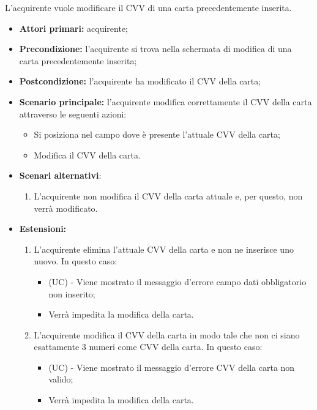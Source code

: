L'acquirente vuole modificare il CVV di una carta precedentemente inserita.
\begin{itemize}
    \item \textbf{Attori primari:} acquirente;
    \item \textbf{Precondizione:} l'acquirente si trova nella schermata di modifica di una carta precedentemente inserita;
    \item \textbf{Postcondizione:} l'acquirente ha modificato il CVV della carta;
    \item \textbf{Scenario principale:} l'acquirente modifica correttamente il CVV della carta attraverso le seguenti azioni:
    \begin{itemize}
        \item Si posiziona nel campo dove è presente l'attuale CVV della carta;
        \item Modifica il CVV della carta.
    \end{itemize}
    \item \textbf{Scenari alternativi}:
    \begin{enumerate}[label=\lett]
        \item L'acquirente non modifica il CVV della carta attuale e, per questo, non verrà modificato.
    \end{enumerate}
    \item \textbf{Estensioni:}
    \begin{enumerate}[label=\lett]
        \item L'acquirente elimina l'attuale CVV della carta e non ne inserisce uno nuovo. In questo caso:
        \begin{itemize}
            \item (UC) - Viene mostrato il messaggio d'errore campo dati obbligatorio non inserito;
            \item Verrà impedita la modifica della carta.
        \end{itemize}
        \item L'acquirente modifica il CVV della carta in modo tale che non ci siano esattamente 3 numeri come CVV della carta. In questo caso:
        \begin{itemize}
            \item (UC) - Viene mostrato il messaggio d'errore CVV della carta non valido;
            \item Verrà impedita la modifica della carta.
        \end{itemize}
    \end{enumerate}
\end{itemize}

